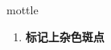 
\begin{frame}
{\huge mottle}
\begin{center}
\begin{enumerate}\Large
  \item \textbf{标记上杂色斑点}
\end{enumerate}
\end{center}
\end{frame}
